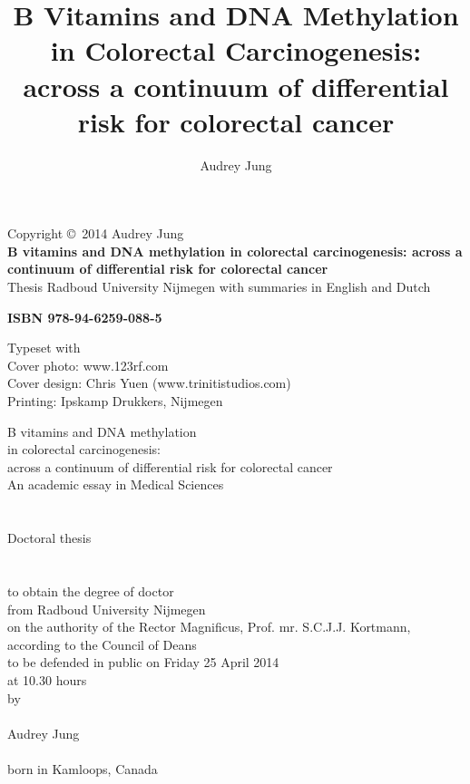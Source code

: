 \documentclass[10pt, letterpaper, twoside]{book} %
\title{{\bf B Vitamins and DNA Methylation \\ in Colorectal Carcinogenesis}: \\  \vspace{0.5ex}\Large across a continuum of differential \\ risk for colorectal cancer}
\author{Audrey Jung}
\date{}
\begin{document}


\maketitle

\newpage
  \thispagestyle{empty}
  \noindent Copyright \copyright\ 2014 Audrey Jung\\
  \textbf{B vitamins and DNA methylation in colorectal carcinogenesis: across a continuum of differential risk for colorectal cancer}\\
  \noindent Thesis Radboud University Nijmegen with summaries in English and Dutch

  \noindent \textbf{ISBN 978-94-6259-088-5}

  \noindent Typeset with \LaTeXe\\
  \noindent Cover photo: www.123rf.com\\
  \noindent Cover design: Chris Yuen (www.trinitistudios.com)\\
  \noindent Printing: Ipskamp Drukkers, Nijmegen\\


\newpage
\thispagestyle{empty}
\begin{center}
  {\Large B vitamins and DNA methylation\\ in colorectal carcinogenesis: \\ [0.3cm] \large across a continuum of differential risk for colorectal cancer}\\
  \bigskip
  \bigskip
  \bigskip
  \bigskip
  An academic essay in Medical Sciences\\
\quad\\
\quad\\
  {\large Doctoral thesis}\\
\quad\\
\quad\\
  to obtain the degree of doctor\\
  \smallskip
  from Radboud University Nijmegen\\
  \smallskip
  on the authority of the Rector Magnificus, Prof. mr. S.C.J.J. Kortmann,\\
  \smallskip
  according to the Council of Deans\\
  \smallskip
  to be defended in public on Friday 25 April 2014\\
  \smallskip
  at 10.30 hours\\
  \smallskip
  by\\
  \qquad\\
  {\large Audrey Jung}\\
\qquad\\
  born in Kamloops, Canada\\
  \smallskip
\end{center}
\end{document}
